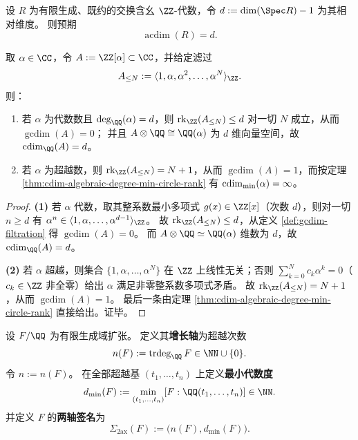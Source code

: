 \begin{conjecture}\label{conj:acdim-krull-dimension}
设 \(R\) 为有限生成、既约的交换含幺 \(\ZZ\)-代数，令
\(
d:=\dim(\Spec R)-1
\)
为其相对维度。
则预期
\[
\operatorname{acdim}(R)=d.
\]
\end{conjecture}

\begin{theorem}\label{thm:gcdim-zalpha-dichotomy}
取 \(\alpha\in\CC\)，令 \(A:=\ZZ[\alpha]\subset\CC\)，并给定滤过
\[
A_{\le N}:=\langle 1,\alpha,\alpha^2,\dots,\alpha^N\rangle_{\ZZ}.
\]
则：
\begin{enumerate}
  \item 若 \(\alpha\) 为代数数且 \(\deg_{\QQ}(\alpha)=d\)，则 \(\operatorname{rk}_{\ZZ}(A_{\le N})\le d\) 对一切 \(N\) 成立，从而 \(\operatorname{gcdim}(A)=0\)；
        并且 \(A\otimes\QQ\cong \QQ(\alpha)\) 为 \(d\) 维向量空间，故 \(\cdim_{\QQ}(A)=d\)。
  \item 若 \(\alpha\) 为超越数，则 \(\operatorname{rk}_{\ZZ}(A_{\le N})=N+1\)，从而 \(\operatorname{gcdim}(A)=1\)，而按定理 \ref{thm:cdim-algebraic-degree-min-circle-rank} 有 \(\operatorname{cdim}_{\min}(\alpha)=\infty\)。
\end{enumerate}
\end{theorem}
\begin{proof}
\textbf{(1)} 若 \(\alpha\) 代数，取其整系数最小多项式 \(g(x)\in\ZZ[x]\)（次数 \(d\)），则对一切 \(n\ge d\) 有 \(\alpha^n\in \langle 1,\alpha,\dots,\alpha^{d-1}\rangle_{\ZZ}\)。
故 \(\operatorname{rk}_{\ZZ}(A_{\le N})\le d\)，从定义 \ref{def:gcdim-filtration} 得 \(\operatorname{gcdim}(A)=0\)。
而 \(A\otimes\QQ\simeq \QQ(\alpha)\) 维数为 \(d\)，故 \(\cdim_{\QQ}(A)=d\)。
\par
\textbf{(2)} 若 \(\alpha\) 超越，则集合 \(\{1,\alpha,\dots,\alpha^N\}\) 在 \(\ZZ\) 上线性无关；否则 \(\sum_{k=0}^{N}c_k\alpha^k=0\)（\(c_k\in\ZZ\) 非全零）给出 \(\alpha\) 满足非零整系数多项式矛盾。
故 \(\operatorname{rk}_{\ZZ}(A_{\le N})=N+1\)，从而 \(\operatorname{gcdim}(A)=1\)。
最后一条由定理 \ref{thm:cdim-algebraic-degree-min-circle-rank} 直接给出。证毕。
\end{proof}

\begin{definition}\label{def:gcdim-two-axis-signature}
设 \(F/\QQ\) 为有限生成域扩张。
定义其\textbf{增长轴}为超越次数
\[
n(F):=\operatorname{trdeg}_{\QQ}F\in\NN\cup\{0\}.
\]
令 \(n:=n(F)\)。
在全部超越基 \((t_1,\dots,t_n)\) 上定义\textbf{最小代数度}
\[
d_{\min}(F):=\min_{(t_1,\dots,t_n)}[F:\QQ(t_1,\dots,t_n)]\in\NN.
\]
并定义 \(F\) 的\textbf{两轴签名}为
\[
\Sigma_{\mathrm{2ax}}(F):=\bigl(n(F),d_{\min}(F)\bigr).
\]
\end{definition}

